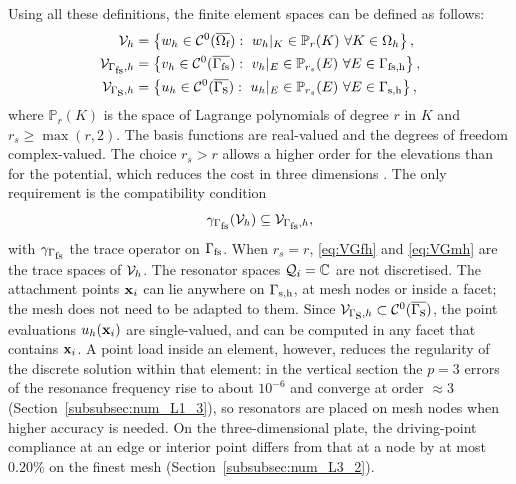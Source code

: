 

Using all these definitions, the finite element spaces can be defined as follows:
\begin{align}
    \label{eq:Vh}
    \V_h&=\left\{w_h\in\mathcal{C}^0(\overline{\Of}):\ w_h|_K\in\mathbb{P}_r(K)\ \forall K\in\Omega_h\right\},\\
    \label{eq:VGfh}
    \V_{\Gf,h}&=\left\{v_h\in\mathcal{C}^0(\overline{\Gf}):\ v_h|_E\in\mathbb{P}_{r_s}(E)\ \forall E\in\Gfh\right\},\\
    \label{eq:VGmh}
    \V_{\Gm,h}&=\left\{u_h\in\mathcal{C}^0(\overline{\Gm}):\ u_h|_E\in\mathbb{P}_{r_s}(E)\ \forall E\in\Gmh\right\},
\end{align}
where $\mathbb{P}_r(K)$ is the space of Lagrange polynomials of degree $r$ in $K$ and $r_s\geq\max(r,2)$. The basis functions are real-valued and the degrees of freedom complex-valued. The choice $r_s>r$ allows a higher order for the elevations than for the potential, which reduces the cost in three dimensions \cite{colomes2023monolithic}. The only requirement is the compatibility condition
\begin{equation}\label{eq:trace_compatibility}
    \gamma_{\Gamma_{\mbox{\scriptsize fs}}}(\mathcal{V}_h)\subseteq\mathcal{V}_{\Gamma_{\mbox{\scriptsize fs}},h},
\end{equation}
with $\gamma_{\Gamma_{\mbox{\scriptsize fs}}}$ the trace operator on $\Gamma_{\mbox{\scriptsize fs}}$. When $r_s=r$, \eqref{eq:VGfh} and \eqref{eq:VGmh} are the trace spaces of $\mathcal{V}_h$. The resonator spaces $\mathcal{Q}_i=\mathbb{C}$ are not discretised. The attachment points $\mathbf{x}_i$ can lie anywhere on $\Gamma_{\mbox{\scriptsize s,h}}$, at mesh nodes or inside a facet; the mesh does not need to be adapted to them. Since $\mathcal{V}_{\Gamma_{\mbox{s}},h}\subset\mathcal{C}^0(\overline{\Gamma_{\mbox{s}}})$, the point evaluations $u_h(\mathbf{x}_i)$ are single-valued, and can be computed in any facet that contains $\mathbf{x}_i$. {\color{red}A point load inside an element, however, reduces the regularity of the discrete solution within that element: in the vertical section the $p=3$ errors of the resonance frequency rise to about $10^{-6}$ and converge at order $\approx3$ (Section~\ref{subsubsec:num_L1_3}), so resonators are placed on mesh nodes when higher accuracy is needed. On the three-dimensional plate, the driving-point compliance at an edge or interior point differs from that at a node by at most $0.20\%$ on the finest mesh (Section~\ref{subsubsec:num_L3_2}).}


